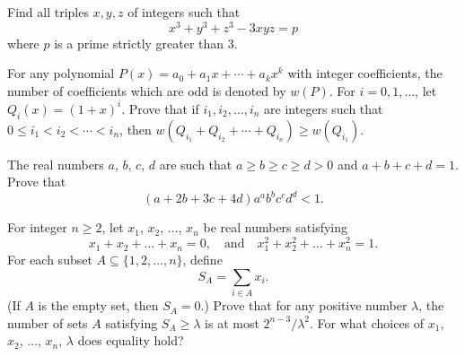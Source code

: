 \documentclass{article}
\begin{document}
\begin{exercise}
    Find all triples $x,y,z$ of integers such that 
        \begin{equation*}
                x^3 + y^3 + z^3 -3xyz = p
        \end{equation*}
        where $p$ is a prime strictly greater than 3.
\end{exercise}

\begin{exercise} 
For any polynomial $P(x) = a_0 + a_1 x + \cdots + a_k x^k$ with integer coefficients, the number of coefficients which are odd is denoted by $w(P)$. For $i = 0, 1, \ldots$, let $Q_i (x) = (1+x)^i$. Prove that if $i_1, i_2, \ldots , i_n$ are integers such that $0 \leq i_1 < i_2 < \cdots < i_n$, then
$w(Q_{i_1} + Q_{i_2} + \cdots + Q_{i_n}) \ge w(Q_{i_1})$.
\end{exercise}

\begin{exercise} 
The real numbers $a$, $b$, $c$, $d$ are such that $a \geq b \geq c \geq d > 0$ and $a + b + c + d = 1$. Prove that\[(a + 2b + 3c + 4d) a^a b^b c^c d^d < 1.\]
\end{exercise}

\begin{exercise} 
    For integer $n \ge 2$, let $x_1$, $x_2$, $\dots$, $x_n$ be real numbers satisfying\[x_1 + x_2 + \dots + x_n = 0, \quad \text{and} \quad x_1^2 + x_2^2 + \dots + x_n^2 = 1.\]For each subset $A \subseteq \{1, 2, \dots, n\}$, define\[S_A = \sum_{i \in A} x_i.\](If $A$ is the empty set, then $S_A = 0$.)
Prove that for any positive number $\lambda$, the number of sets $A$ satisfying $S_A \ge \lambda$ is at most $2^{n - 3}/\lambda^2$. For what choices of $x_1$, $x_2$, $\dots$, $x_n$, $\lambda$ does equality hold?
\end{exercise}
\end{document}
